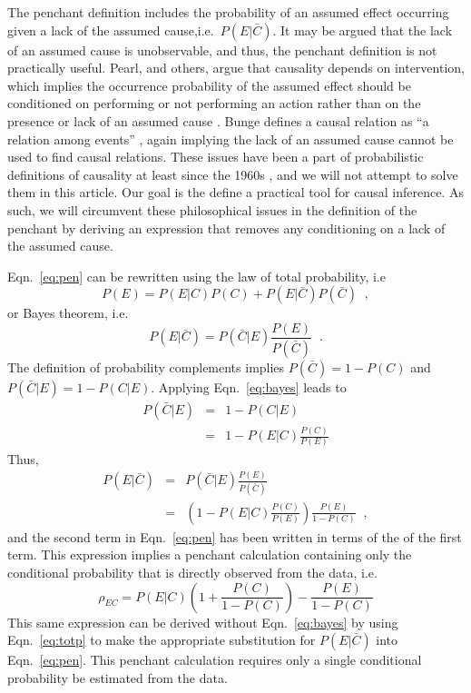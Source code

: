 \documentclass[a4paper,11pt,twocolumn]{article}
\begin{document}
The penchant definition includes the probability of an assumed effect occurring given a lack of the assumed cause,i.e.\ $P(E|\bar{C})$.  It may be argued that the lack of an assumed cause is unobservable, and thus, the penchant definition is not practically useful.  Pearl, and others, argue that causality depends on intervention, which implies the occurrence probability of the assumed effect should be conditioned on performing or not performing an action rather than on the presence or lack of an assumed cause \cite{Pearl}.  Bunge defines a causal relation as ``a relation among events'' \cite{Bunge}, again implying the lack of an assumed cause cannot be used to find causal relations.  These issues have been a part of probabilistic definitions of causality at least since the 1960s \cite{Suppes}, and we will not attempt to solve them in this article.  Our goal is the define a practical tool for causal inference.  As such, we will circumvent these philosophical issues in the definition of the penchant by deriving an expression that removes any conditioning on a lack of the assumed cause.

Eqn.\ \ref{eq:pen} can be rewritten using the law of total probability, i.e
\begin{equation}
\label{eq:totp}
P(E) = P(E|C)P(C) + P(E|\bar{C})P(\bar{C})\;\;,
\end{equation}
or Bayes theorem, i.e.\ 
\begin{equation}
\label{eq:bayes}
P(E|\bar{C}) = P(\bar{C}|E)\frac{P(E)}{P(\bar{C})}\;\;.
\end{equation}
The definition of probability complements implies $P(\bar{C}) = 1-P(C)$ and $P(\bar{C}|E) = 1-P(C|E)$.  Applying Eqn.\ \ref{eq:bayes} leads to
\begin{eqnarray*}
P(\bar{C}|E) &=& 1-P(C|E)\\
&=& 1-P(E|C)\frac{P(C)}{P(E)}
\end{eqnarray*}
Thus,
\begin{eqnarray*}
P(E|\bar{C}) &=& P(\bar{C}|E)\frac{P(E)}{P(\bar{C})}\\
&=&\left(1-P(E|C)\frac{P(C)}{P(E)}\right)\frac{P(E)}{1-P(C)}\;\;,
\end{eqnarray*}
and the second term in Eqn.\ \ref{eq:pen} has been written in terms of the of the first term.  This expression implies a penchant calculation containing only the conditional probability that is directly observed from the data, i.e.\
\begin{equation}
\label{eq:pencal}
\rho_{EC} = P(E|C)\left(1+\frac{P(C)}{1-P(C)}\right)-\frac{P(E)}{1-P(C)}
\end{equation}
This same expression can be derived without Eqn.\ \ref{eq:bayes} by using Eqn.\ \ref{eq:totp} to make the appropriate substitution for $P(E|\bar{C})$ into Eqn.\ \ref{eq:pen}.  This penchant calculation requires only a single conditional probability be estimated from the data.
\end{document}
